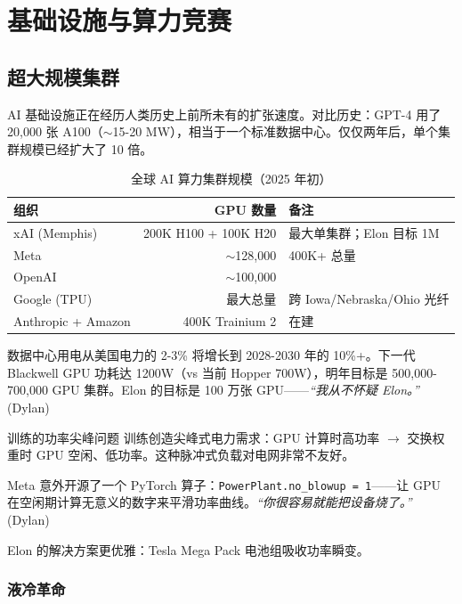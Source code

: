 \section{基础设施与算力竞赛}

\subsection{超大规模集群}

AI 基础设施正在经历人类历史上前所未有的扩张速度。对比历史：GPT-4 用了 20,000 张 A100（$\sim$15-20 MW），相当于一个标准数据中心。仅仅两年后，单个集群规模已经扩大了 10 倍。

\begin{table}[H]
\centering
\begin{tabular}{lrl}
\toprule
\textbf{组织} & \textbf{GPU 数量} & \textbf{备注} \\
\midrule
xAI (Memphis) & 200K H100 + 100K H20 & 最大单集群；Elon 目标 1M \\
Meta & $\sim$128,000 & 400K+ 总量 \\
OpenAI & $\sim$100,000 & \\
Google (TPU) & 最大总量 & 跨 Iowa/Nebraska/Ohio 光纤 \\
Anthropic + Amazon & 400K Trainium 2 & 在建 \\
\bottomrule
\end{tabular}
\caption{全球 AI 算力集群规模（2025 年初）}
\end{table}

数据中心用电从美国电力的 2-3\% 将增长到 2028-2030 年的 10\%+。下一代 Blackwell GPU 功耗达 1200W（vs 当前 Hopper 700W），明年目标是 500,000-700,000 GPU 集群。Elon 的目标是 100 万张 GPU——\textit{``我从不怀疑 Elon。''} (Dylan)

\begin{knowledgebox}{训练的功率尖峰问题}
训练创造尖峰式电力需求：GPU 计算时高功率 $\to$ 交换权重时 GPU 空闲、低功率。这种脉冲式负载对电网非常不友好。

Meta 意外开源了一个 PyTorch 算子：\texttt{PowerPlant.no\_blowup = 1}——让 GPU 在空闲期计算无意义的数字来平滑功率曲线。\textit{``你很容易就能把设备烧了。''} (Dylan)

Elon 的解决方案更优雅：Tesla Mega Pack 电池组吸收功率瞬变。
\end{knowledgebox}

\subsubsection{液冷革命}

